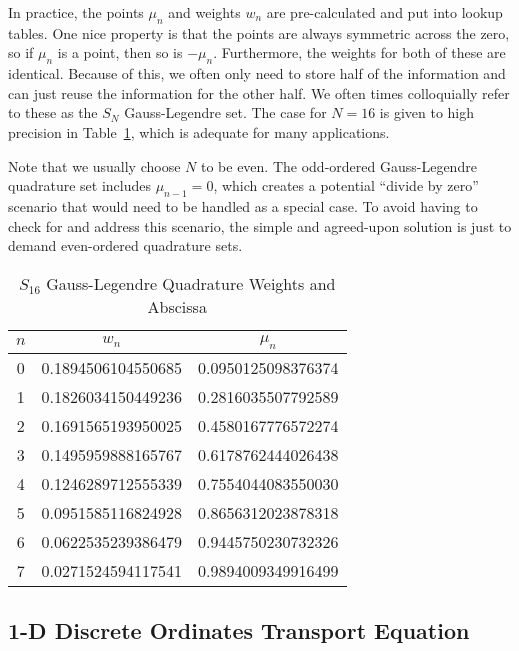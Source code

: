 In practice, the points $\mu_n$ and weights $w_n$ are pre-calculated and put into lookup tables. One nice property is that the points are always symmetric across the zero, so if $\mu_n$ is a point, then so is $-\mu_n$. Furthermore, the weights for both of these are identical. Because of this, we often only need to store half of the information and can just reuse the information for the other half. We often times colloquially refer to these as the $S_N$ Gauss-Legendre set. The case for $N = 16$ is given to high precision in Table~\ref{Table:neutronics_S16GaussLegendreQuadratureWeightsAbscissa}, which is adequate for many applications. 

Note that we usually choose $N$ to be even. The odd-ordered Gauss-Legendre quadrature set includes $\mu_{n-1} = 0$, which creates a potential ``divide by zero'' scenario that would need to be handled as a special case. To avoid having to check for and address this scenario, the simple and agreed-upon solution is just to demand even-ordered quadrature sets.

\begin{table}[tb!]
\caption{$S_{16}$ Gauss-Legendre Quadrature Weights and Abscissa}
\begin{center}
\begin{tabular}{|c|c|c|} \hline
$n$	& $w_n$					& $\mu_n$				\\ \hline
0	& 0.1894506104550685	& 0.0950125098376374	\\
1	& 0.1826034150449236	& 0.2816035507792589	\\
2	& 0.1691565193950025	& 0.4580167776572274	\\
3	& 0.1495959888165767	& 0.6178762444026438	\\
4	& 0.1246289712555339	& 0.7554044083550030	\\
5	& 0.0951585116824928	& 0.8656312023878318	\\
6	& 0.0622535239386479	& 0.9445750230732326	\\
7	& 0.0271524594117541	& 0.9894009349916499	\\ \hline
\end{tabular}
\end{center}
\label{Table:neutronics_S16GaussLegendreQuadratureWeightsAbscissa}
\end{table}%





\subsection{1-D Discrete Ordinates Transport Equation}

